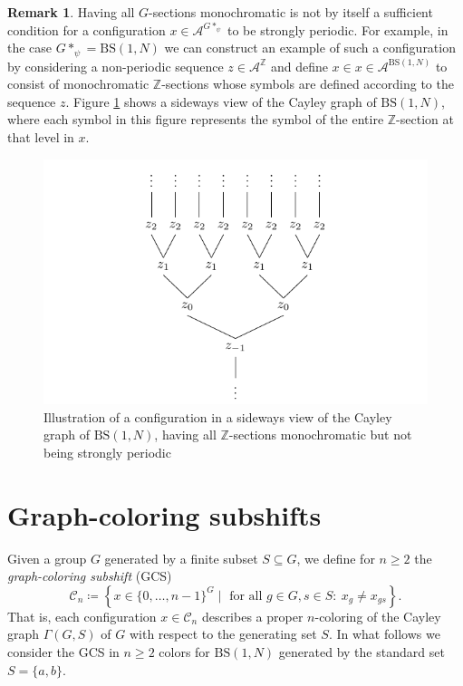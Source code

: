 \documentclass[letterpaper,11pt,reqno]{amsart}
\theoremstyle{plain}
\theoremstyle{definition}
\theoremstyle{cupremark}
\newtheorem{remark}[theorem]{Remark}
\newcommand{\BS}[1][N]{\mathrm{BS}(1,#1)}
\begin{document}
\begin{remark} Having all $G$-sections monochromatic is not by itself a sufficient condition for a configuration $x\in \mathcal{A}^{G*_{\psi}}$ to be strongly periodic. For example, in the case $G*_{\psi}=\BS$ we can construct an example of such a configuration by considering a non-periodic sequence $z\in \mathcal{A}^\mathbb{Z}$ and define $x\in x\in \mathcal{A}^{\BS}$ to consist of monochromatic $\mathbb{Z}$-sections whose symbols are defined according to the sequence $z$. Figure \ref{fig:monochromatic_rows_tree_counterexample} shows a sideways view of the Cayley graph of $\BS$, where each symbol in this figure represents the symbol of the entire $\mathbb{Z}$-section at that level in $x$.
	\begin{figure}
		\centering
		\includegraphics{tree_aperiodic.pdf}
		\caption{Illustration of a configuration in a sideways view of the Cayley graph of $\BS$, having all $\mathbb{Z}$-sections monochromatic but not being strongly periodic}
		\label{fig:monochromatic_rows_tree_counterexample}
	\end{figure}
\end{remark}



\section{Graph-coloring subshifts}\label{section:graph_coloring_subshifts}
Given a group $G$ generated by a finite subset $S\subseteq G$, we define for $n\ge 2$ the \textit{graph-coloring subshift} (GCS)
$$
\mathcal{C}_{n}\coloneqq\left\{x\in \{0,\ldots,n-1\}^G\mid \text{ for all } g\in G, s\in S: \ x_{g}\neq x_{gs} \right\}.
$$
That is, each configuration $x\in \mathcal{C}_{n}$ describes a proper $n$-coloring of the Cayley graph $\Gamma(G,S)$ of $G$ with respect to the generating set $S$. In what follows we consider the GCS in $n\ge 2$ colors for $\BS$ generated by the standard set $S=\{a,b\}$.
\end{document}
